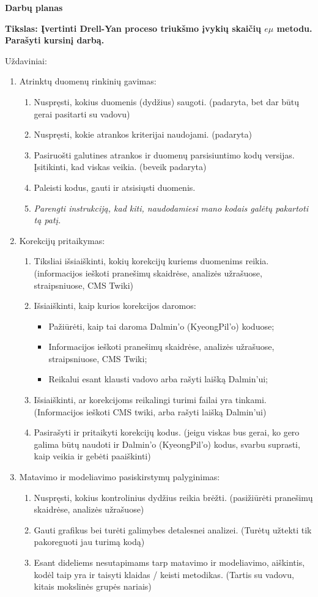 \documentclass[a4paper, 12pt]{article}
\begin{document}
\textbf{Darbų planas}

\textbf{Tikslas: Įvertinti Drell-Yan proceso triukšmo įvykių skaičių $e\mu$ metodu. Parašyti kursinį darbą.}

Uždaviniai:
\begin{enumerate}
	\item Atrinktų duomenų rinkinių gavimas:
	\begin{enumerate}
		\item Nuspręsti, kokius duomenis (dydžius) saugoti. (padaryta, bet dar būtų gerai pasitarti su vadovu)
		\item Nuspręsti, kokie atrankos kriterijai naudojami. (padaryta)
		\item Pasiruošti galutines atrankos ir duomenų parsisiuntimo kodų versijas.
		Įsitikinti, kad viskas veikia. (beveik padaryta)
		\item Paleisti kodus, gauti ir atsisiųsti duomenis.
		\item \textit{Parengti instrukciją, kad kiti, naudodamiesi mano kodais galėtų pakartoti tą patį.}
	\end{enumerate}
	
	\item Korekcijų pritaikymas:
	\begin{enumerate}
		\item Tiksliai išsiaiškinti, kokių korekcijų kuriems duomenims reikia.
		(informacijos ieškoti pranešimų skaidrėse, analizės užrašuose, straipsniuose, CMS Twiki)
		\item Išsiaiškinti, kaip kurios korekcijos daromos:
		\begin{itemize}
			\item Pažiūrėti, kaip tai daroma Dalmin'o (KyeongPil'o) koduose;
			\item Informacijos ieškoti pranešimų skaidrėse, analizės užrašuose, straipsniuose, CMS Twiki;
			\item Reikalui esant klausti vadovo arba rašyti laišką Dalmin'ui;
		\end{itemize}
		\item Išsiaiškinti, ar korekcijoms reikalingi turimi failai yra tinkami.
		(Informacijos ieškoti CMS twiki, arba rašyti laišką Dalmin'ui)
		\item Pasirašyti ir pritaikyti korekcijų kodus. (jeigu viskas bus gerai, ko gero galima
		būtų naudoti ir Dalmin'o (KyeongPil'o) kodus, svarbu suprasti, kaip veikia ir gebėti paaiškinti)
	\end{enumerate}
	
	\item Matavimo ir modeliavimo pasiskirstymų palyginimas:
	\begin{enumerate}
		\item Nuspręsti, kokius kontrolinius dydžius reikia brėžti.
		(pasižiūrėti pranešimų skaidrėse, analizės užrašuose)
		\item Gauti grafikus bei turėti galimybes detalesnei analizei.
		(Turėtų užtekti tik pakoreguoti jau turimą kodą)
		\item Esant dideliems nesutapimams tarp matavimo ir modeliavimo, aiškintis, kodėl
		taip yra ir taisyti klaidas / keisti metodikas. (Tartis su vadovu, kitais mokslinės
		grupės nariais)
	\end{enumerate}
	

\end{enumerate}
\end{document}
